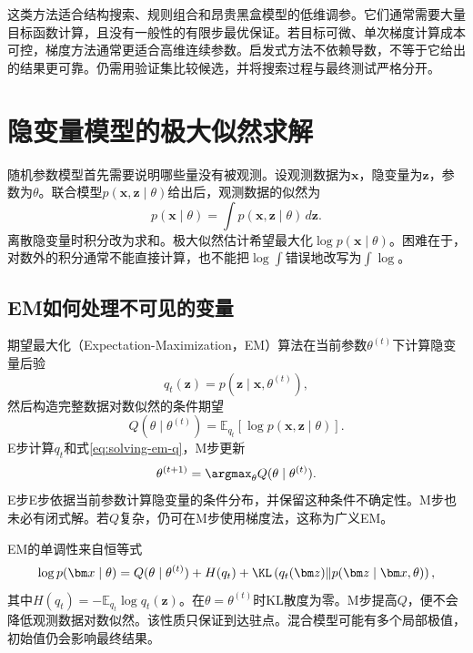 这类方法适合结构搜索、规则组合和昂贵黑盒模型的低维调参。它们通常需要大量目标函数计算，且没有一般性的有限步最优保证。若目标可微、单次梯度计算成本可控，梯度方法通常更适合高维连续参数。启发式方法不依赖导数，不等于它给出的结果更可靠。仍需用验证集比较候选，并将搜索过程与最终测试严格分开。

\section{隐变量模型的极大似然求解}

随机参数模型首先需要说明哪些量没有被观测。设观测数据为$\bm x$，隐变量为$\bm z$，参数为$\theta$。联合模型$p(\bm x,\bm z\mid\theta)$给出后，观测数据的似然为
\begin{equation}
 p(\bm x\mid\theta)=\int p(\bm x,\bm z\mid\theta)\,d\bm z.
 \label{eq:solving-marginal-likelihood}
\end{equation}
离散隐变量时积分改为求和。极大似然估计希望最大化$\log p(\bm x\mid\theta)$。困难在于，对数外的积分通常不能直接计算，也不能把$\log\int$错误地改写为$\int\log$。

\subsection{EM如何处理不可见的变量}
期望最大化（Expectation-Maximization，EM）算法在当前参数$\theta^{(t)}$下计算隐变量后验
\begin{equation}
 q_t(\bm z)=p(\bm z\mid\bm x,\theta^{(t)}),
\end{equation}
然后构造完整数据对数似然的条件期望
\begin{equation}
 Q(\theta\mid\theta^{(t)})=
 \mathbb E_{q_t}[\log p(\bm x,\bm z\mid\theta)].
 \label{eq:solving-em-q}
\end{equation}
E步计算$q_t$和式\eqref{eq:solving-em-q}，M步更新
\begin{equation}
 \theta^{(t+1)}=\argmax_\theta Q(\theta\mid\theta^{(t)}).
 \label{eq:solving-em-m}
\end{equation}
E步E步依据当前参数计算隐变量的条件分布，并保留这种条件不确定性。M步也未必有闭式解。若$Q$复杂，仍可在M步使用梯度法，这称为广义EM。

EM的单调性来自恒等式
\begin{equation}
 \log p(\bm x\mid\theta)=Q(\theta\mid\theta^{(t)})+
 H(q_t)+\KL\left(q_t(\bm z)\|p(\bm z\mid\bm x,\theta)\right),
 \label{eq:solving-em-decomposition}
\end{equation}
其中$H(q_t)=-\mathbb E_{q_t}\log q_t(\bm z)$。在$\theta=\theta^{(t)}$时KL散度为零。M步提高$Q$，便不会降低观测数据对数似然。该性质只保证到达驻点。混合模型可能有多个局部极值，初始值仍会影响最终结果。

